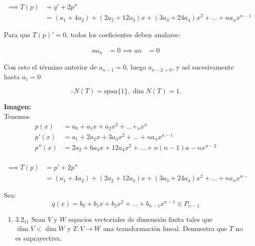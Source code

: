 \documentclass{article}
\begin{document}
\begin{enumerate}
			\begin{equation*}
				\begin{aligned}
					\implies T(p) &= q' + 2p'' \\
								  &= (a_1 + 4a_2) + (2a_2+12a_3)x + (3a_3+24a_4)x^2 + \dots + n a_n x^{n-1}
				\end{aligned}
			\end{equation*}
			
			Para que \(T(p)'=0\), todos los coeficientes deben anularse:
			
			\begin{equation*}
				\begin{aligned}
					na_n &= 0
					\implies an &=0
				\end{aligned}
			\end{equation*}
			
			Con esto el término anterior de \(a_{n-1}=0\), luego \(a_{n-2=0}\), y así sucesivamente hasta \(a_1=0\)
			
			\[
			\boxed{\therefore N(T)= \text{span}\{1\}, \dim N(T)=1.}
			\]
			
			\textbf{Imagen: }\\
			Tenemos
			\begin{equation*}
				\begin{aligned}
					p(x) &= a_0+a_1x+a_2x^2+\dots +_nx^{n} \\
					p'(x)  &= a_1+2a_2x+3a_3x^2+ \dots +na_{n}x^{n-1} \\
					p''(x) &= 2a_2+6a_3x+12a_4x^2+ \dots +n(n-1)a-{n}x^{n-2} \\
				\end{aligned}
			\end{equation*}
			
			\begin{equation*}
				\begin{aligned}
					\implies T(p) &=p'+2p'' \\
								  &=(a_1+4a_2)+(2a_2+12a_3)x+(3a_3+24a_4)x^2+\dots +na_{n}x^{n-}
				\end{aligned}
			\end{equation*}
			
			Sea:
			\begin{equation*}
				q(x)=b_0+b_1x+b_2x^2+\dots +b_{n-1}x^{n-1} \in P_{n-1}
			\end{equation*}
			
		\end{enumerate}
		
		\begin{enumerate}
			
			\item[] \(3.2_{11}\) Sean \(V\) y \(W\) espacios vectoriales de dimensión finita tales que \(\dim V<\dim W\) y \(T:V\to W\) una transformación lineal. Demuestra que \(T\) no es suprayectiva.
			
		\end{enumerate}
		
\end{document}
